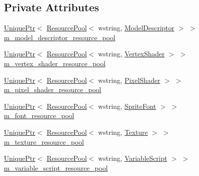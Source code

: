 \subsection*{Private Attributes}
\begin{DoxyCompactItemize}
\item 
\hyperlink{namespacemage_a8c307fbcc33bce9b7f2aa4c26c3b95cf}{Unique\+Ptr}$<$ \hyperlink{classmage_1_1_resource_pool}{Resource\+Pool}$<$ wstring, \hyperlink{classmage_1_1_model_descriptor}{Model\+Descriptor} $>$ $>$ \hyperlink{classmage_1_1_resource_factory_a1739407c8918b375e7feaa2240628bde}{m\+\_\+model\+\_\+descriptor\+\_\+resource\+\_\+pool}
\item 
\hyperlink{namespacemage_a8c307fbcc33bce9b7f2aa4c26c3b95cf}{Unique\+Ptr}$<$ \hyperlink{classmage_1_1_resource_pool}{Resource\+Pool}$<$ wstring, \hyperlink{classmage_1_1_vertex_shader}{Vertex\+Shader} $>$ $>$ \hyperlink{classmage_1_1_resource_factory_a9f961cc4c47821c9fadbac05b9b88c07}{m\+\_\+vertex\+\_\+shader\+\_\+resource\+\_\+pool}
\item 
\hyperlink{namespacemage_a8c307fbcc33bce9b7f2aa4c26c3b95cf}{Unique\+Ptr}$<$ \hyperlink{classmage_1_1_resource_pool}{Resource\+Pool}$<$ wstring, \hyperlink{classmage_1_1_pixel_shader}{Pixel\+Shader} $>$ $>$ \hyperlink{classmage_1_1_resource_factory_a987af631d0fda02fd336ceb02113a128}{m\+\_\+pixel\+\_\+shader\+\_\+resource\+\_\+pool}
\item 
\hyperlink{namespacemage_a8c307fbcc33bce9b7f2aa4c26c3b95cf}{Unique\+Ptr}$<$ \hyperlink{classmage_1_1_resource_pool}{Resource\+Pool}$<$ wstring, \hyperlink{classmage_1_1_sprite_font}{Sprite\+Font} $>$ $>$ \hyperlink{classmage_1_1_resource_factory_a22db66fbf8dc004124c724770007f056}{m\+\_\+font\+\_\+resource\+\_\+pool}
\item 
\hyperlink{namespacemage_a8c307fbcc33bce9b7f2aa4c26c3b95cf}{Unique\+Ptr}$<$ \hyperlink{classmage_1_1_resource_pool}{Resource\+Pool}$<$ wstring, \hyperlink{classmage_1_1_texture}{Texture} $>$ $>$ \hyperlink{classmage_1_1_resource_factory_a0bb6251c64ac1f5e9de04968f9d78e57}{m\+\_\+texture\+\_\+resource\+\_\+pool}
\item 
\hyperlink{namespacemage_a8c307fbcc33bce9b7f2aa4c26c3b95cf}{Unique\+Ptr}$<$ \hyperlink{classmage_1_1_resource_pool}{Resource\+Pool}$<$ wstring, \hyperlink{classmage_1_1_variable_script}{Variable\+Script} $>$ $>$ \hyperlink{classmage_1_1_resource_factory_a78b0848a3aa92c338d2bc209996dd649}{m\+\_\+variable\+\_\+script\+\_\+resource\+\_\+pool}
\end{DoxyCompactItemize}


